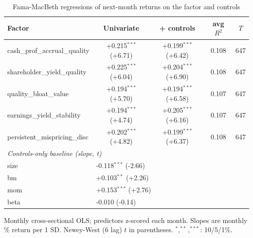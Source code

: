 \begin{table}[htbp]\centering
\caption{Fama-MacBeth regressions of next-month returns on the factor and controls}
\label{tab:fm}
\begin{threeparttable}\footnotesize
\begin{tabular}{lcccc}
\toprule
Factor & Univariate & + controls & avg $R^2$ & $T$ \\
\midrule
cash\_prof\_accrual\_quality & +0.215$^{***}$ (+6.71) & +0.199$^{***}$ (+6.42) & 0.108 & 647 \\
shareholder\_yield\_quality & +0.225$^{***}$ (+6.04) & +0.204$^{***}$ (+6.90) & 0.108 & 647 \\
quality\_bloat\_value & +0.194$^{***}$ (+5.70) & +0.194$^{***}$ (+6.58) & 0.107 & 647 \\
earnings\_yield\_stability & +0.194$^{***}$ (+4.74) & +0.205$^{***}$ (+6.16) & 0.107 & 647 \\
persistent\_mispricing\_disc & +0.202$^{***}$ (+4.82) & +0.199$^{***}$ (+6.37) & 0.108 & 647 \\
\midrule
\multicolumn{5}{l}{\textit{Controls-only baseline (slope, t)}} \\
size & \multicolumn{2}{l}{-0.118$^{***}$ (-2.66)} & & \\
bm & \multicolumn{2}{l}{+0.103$^{**}$ (+2.26)} & & \\
mom & \multicolumn{2}{l}{+0.153$^{***}$ (+2.76)} & & \\
beta & \multicolumn{2}{l}{-0.010 (-0.14)} & & \\
\bottomrule
\end{tabular}
\begin{tablenotes}\footnotesize
\item Monthly cross-sectional OLS; predictors z-scored each month. Slopes are monthly \% return per 1 SD. Newey-West (6 lag) $t$ in parentheses. $^{*},^{**},^{***}$: 10/5/1\%.
\end{tablenotes}
\end{threeparttable}
\end{table}